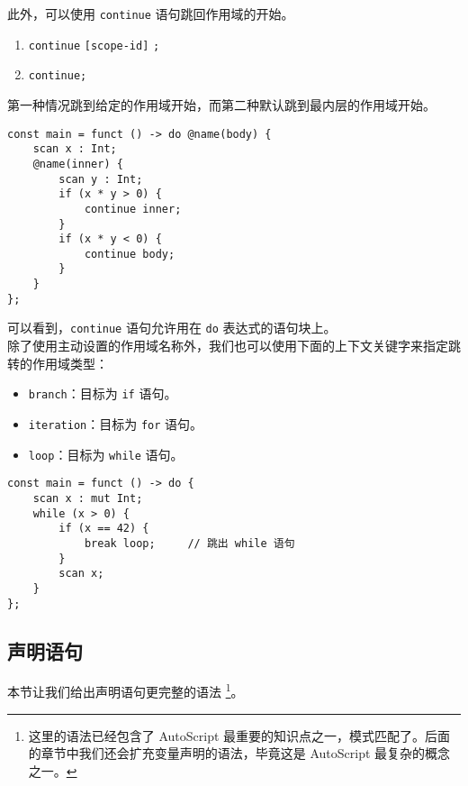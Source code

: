 此外，可以使用 \lstinline!continue! 语句跳回作用域的开始。

\begin{grammar} \label{grm:continue-statement}
\begin{enumerate}
	\item \lstinline!continue! \texttt{[scope-id]} \lstinline!;!
	\item \lstinline!continue;!
\end{enumerate}
\end{grammar}

第一种情况跳到给定的作用域开始，而第二种默认跳到最内层的作用域开始。

\begin{lstlisting}
const main = funct () -> do @name(body) {
    scan x : Int;
    @name(inner) {
        scan y : Int;
        if (x * y > 0) {
            continue inner;
        }
        if (x * y < 0) {
            continue body;
        }
    }
};
\end{lstlisting}

可以看到，\lstinline!continue! 语句允许用在 \lstinline!do! 表达式的语句块上。 \\

除了使用主动设置的作用域名称外，我们也可以使用下面的上下文关键字来指定跳转的作用域类型：

\begin{itemize}
	\item \lstinline!branch!：目标为 \lstinline!if! 语句。
	\item \lstinline!iteration!：目标为 \lstinline!for! 语句。
	\item \lstinline!loop!：目标为 \lstinline!while! 语句。
\end{itemize}

\begin{lstlisting}
const main = funct () -> do {
    scan x : mut Int;
    while (x > 0) {
        if (x == 42) {
            break loop;		// 跳出 while 语句
        }
        scan x;
    }
};
\end{lstlisting}

\subsection{声明语句}

本节让我们给出声明语句更完整的语法 \footnote{这里的语法已经包含了 AutoScript 最重要的知识点之一，模式匹配了。后面的章节中我们还会扩充变量声明的语法，毕竟这是 AutoScript 最复杂的概念之一。}。

